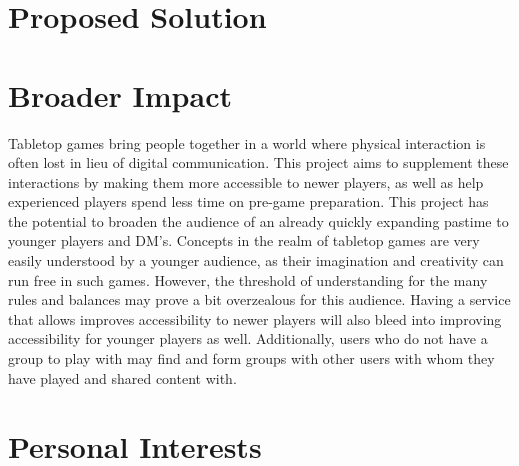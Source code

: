 \documentclass[12pt,a4paper]{report}
\begin{document}
\newpage
\chapter*{Proposed Solution}
	
\newpage
\chapter*{Broader Impact}

Tabletop games bring people together in a world where physical interaction is often lost in lieu of digital communication. This project aims to supplement these interactions by making them more accessible to newer players, as well as help experienced players spend less time on pre-game preparation. This project has the potential to broaden the audience of an already quickly expanding pastime to younger players and DM's. Concepts in the realm of tabletop games are very easily understood by a younger audience, as their imagination and creativity can run free in such games. However, the threshold of understanding for the many rules and balances may prove a bit overzealous for this audience. Having a service that allows improves accessibility to newer players will also bleed into improving accessibility for younger players as well. Additionally, users who do not have a group to play with may find and form groups with other users with whom they have played and shared content with.
	
\newpage
\chapter*{Personal Interests}
\end{document}
